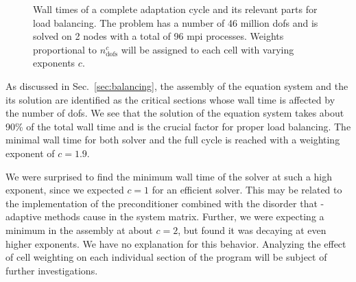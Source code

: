 \begin{figure}
\centering

\caption[Wall times for load balancing with varying weighting exponents.]{Wall times of a complete adaptation cycle and its relevant parts for load balancing. The problem has a number of 46 million \glspl{dof} and is solved on 2 nodes with a total of 96 \gls{mpi} processes. Weights proportional to $n_\text{dofs}^c$ will be assigned to each cell with varying exponents $c$.}
\label{fig:weights}
\end{figure}

As discussed in Sec.~\ref{sec:balancing}, the assembly of the equation system and the its solution are identified as the critical sections whose wall time is affected by the number of \glspl{dof}. We see that the solution of the equation system takes about 90\% of the total wall time and is the crucial factor for proper load balancing. The minimal wall time for both solver and the full cycle is reached with a weighting exponent of $c = 1.9$.

We were surprised to find the minimum wall time of the solver at such a high exponent, since we expected $c = 1$ for an efficient solver. This may be related to the implementation of the preconditioner combined with the disorder that \hp-adaptive methods cause in the system matrix. Further, we were expecting a minimum in the assembly at about $c = 2$, but found it was decaying at even higher exponents. We have no explanation for this behavior. Analyzing the effect of cell weighting on each individual section of the program
will be subject of further investigations.

